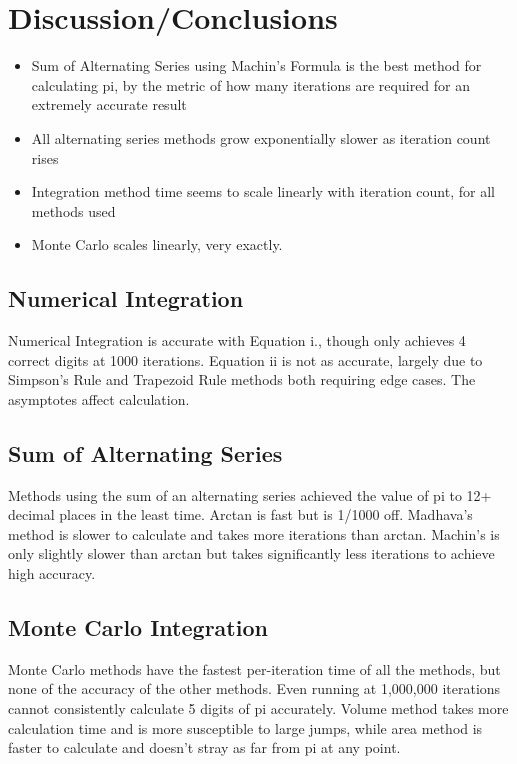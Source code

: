 \documentclass[11pt]{article}
\begin{document}
\section{Discussion/Conclusions}\label{S:5}
\begin{itemize}
	\item Sum of Alternating Series using Machin’s Formula is the best method for calculating pi, by the metric of how many iterations are required for an extremely accurate result
	\item All alternating series methods grow exponentially slower as iteration count rises
	\item Integration method time seems to scale linearly with iteration count, for all methods used
	\item Monte Carlo scales linearly, very exactly.

\end{itemize}

\subsection*{Numerical Integration}
Numerical Integration is accurate with Equation i., though only achieves 4 correct digits at 1000 iterations. 
Equation ii is not as accurate, largely due to Simpson’s Rule and Trapezoid Rule methods both requiring edge cases. The asymptotes affect calculation.

\subsection*{Sum of Alternating Series}
Methods using the sum of an alternating series achieved the value of pi to 12+ decimal places in the least time. 
Arctan is fast but is 1/1000 off.
Madhava’s method is slower to calculate and takes more iterations than arctan.
Machin’s is only slightly slower than arctan but takes significantly less iterations to achieve high accuracy.

\subsection*{Monte Carlo Integration}
Monte Carlo methods have the fastest per-iteration time of all the methods, but none of the accuracy of the other methods. 
Even running at 1,000,000 iterations cannot consistently calculate 5 digits of pi accurately. 
Volume method takes more calculation time and is more susceptible to large jumps, while area method is faster to calculate and doesn’t stray as far from pi at any point.
\end{document}

